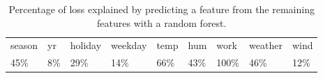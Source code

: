 \begin{table}[ht]
\centering
\begin{tabular}{lllllllll}
  \hline
  \hline
season & yr & holiday & weekday & temp & hum & work & weather & wind \\ 
  45\% & 8\% & 29\% & 14\% & 66\% & 43\% & 100\% & 46\% & 12\% \\ 
   \hline
\end{tabular}
\caption{Percentage of loss explained by predicting a feature from the remaining features with a random forest.} 
\label{tab:predcor}
\end{table}
